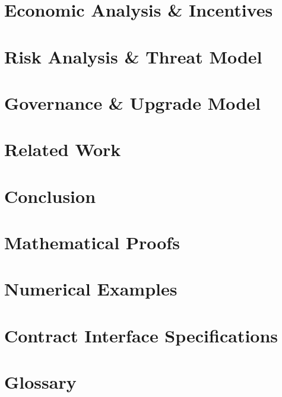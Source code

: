 \documentclass[12pt,a4paper]{report}
\theoremstyle{plain}
\theoremstyle{definition}
\theoremstyle{remark}
\begin{document}
\chapter{Economic Analysis \& Incentives}


\chapter{Risk Analysis \& Threat Model}


\chapter{Governance \& Upgrade Model}


\chapter{Related Work}


\chapter{Conclusion}



\appendix

\chapter{Mathematical Proofs}


\chapter{Numerical Examples}


\chapter{Contract Interface Specifications}


\chapter{Glossary}


\end{document}
